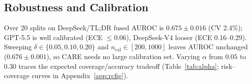\subsection{Robustness and Calibration}
\label{sec:exp:robustness}

Over 20 splits on DeepSeek/TL;DR fused AUROC is $0.675\pm0.016$ (CV 2.4\%); GPT-5.5 is well calibrated (ECE $\leq0.06$), DeepSeek-V4 looser (ECE 0.16--0.29). Sweeping $\delta\in\{0.05,0.10,0.20\}$ and $n_{\text{cal}}\in[200,1000]$ leaves AUROC unchanged ($0.676\pm0.001$), so CARE needs no large calibration set. Varying $\alpha$ from $0.05$ to $0.30$ traces the expected coverage/accuracy tradeoff (Table~\ref{tab:alpha}; risk--coverage curves in Appendix~\ref{app:rcfig}).
